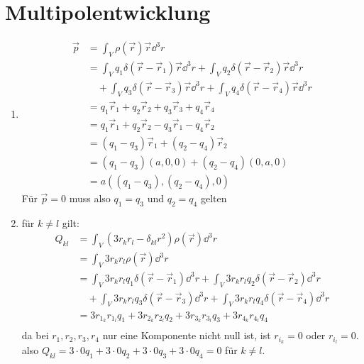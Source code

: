 \documentclass[sectionformat=aufgabe]{gadsescript}
\begin{document}
\section{Multipolentwicklung}
\begin{enumerate}[label=\alph*)]
	\item 
		\begin{align*}
			\vec p &= \int _V \rho( \vec r) \vec r \dd^3 r \\
			&= \int _V q_1 \delta(\vec r - \vec r_1) \vec r \dd^3 r + \int _V q_2 \delta(\vec r - \vec r_2) \vec r \dd^3 r \\
			&\quad+ \int _V q_3 \delta(\vec r - \vec r_3) \vec r \dd^3 r + \int _V q_4\delta(\vec r - \vec r_4) \vec r \dd^3 r\\
			&= q_1 \vec r_1 + q_2 \vec r_2 + q_3 \vec r_3 + q_4 \vec r_4 \\
			&= q_1 \vec r_1 + q_2 \vec r_2 - q_3 \vec r_1 - q_4 \vec r_2 \\
			&= (q_1 - q_3) \vec r_1 + (q_2 - q_4) \vec r_2 \\
			&= (q_1 - q_3) (a, 0, 0) + (q_2 - q_4) (0, a, 0) \\
			&=a ( (q_1 - q_3) , (q_2 - q_4) , 0)
		\end{align*}
		Für $ \vec p = 0 $ muss also $ q_1 = q_3 $ und $ q_2 = q_4 $ gelten
	\item für $ k \neq l $ gilt:
		\begin{align*}
			Q_{kl} &= \int _V \left( 3r_kr_l - \delta_{kl} r^2 \right) \rho(\vec r) \dd ^3 r \\
			&= \int _V 3r_kr_l \rho(\vec r) \dd ^3 r \\
			&= \int _V 3r_kr_l q_1 \delta ( \vec r - \vec r_1) \dd ^3 r + \int _V 3r_kr_l q_2 \delta ( \vec r - \vec r_2) \dd ^3 r \\
			&\quad + \int _V 3r_kr_l q_3 \delta ( \vec r - \vec r_3) \dd ^3 r + \int _V 3r_kr_l q_4 \delta ( \vec r - \vec r_4) \dd ^3 r \\
			&= 3r_{1_k} r_{1_l}  q_1 +  3r_{2_k} r_{2_l}  q_2 +  3r_{3_k} r_{3_l}  q_3 +  3r_{4_k} r_{4_l}  q_4 \\
		\end{align*}
		da bei $ r_1, r_2, r_3, r_4 $ nur eine Komponente nicht null ist, ist $ r_{i_k} = 0 $ oder $ r_{i_l} = 0 $.\\
		also $ Q_{kl} = 3 \cdot 0 q_1 + 3 \cdot 0 q_2 + 3 \cdot 0 q_3 + 3 \cdot 0 q_4 = 0 $ für $ k \neq l $.


\end{enumerate}
\end{document}
